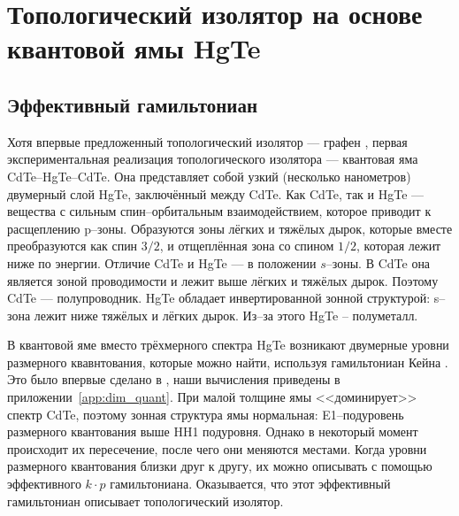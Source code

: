 \section{Топологический изолятор на основе квантовой ямы HgTe}
\subsection{Эффективный гамильтониан}
Хотя впервые предложенный топологический изолятор --- графен \cite{Kane2005}, 
первая экспериментальная реализация топологического изолятора ---
квантовая яма CdTe--HgTe--CdTe. Она представляет собой узкий (несколько нанометров)
двумерный слой HgTe, заключённый между CdTe. Как CdTe, так и HgTe --- вещества 
с сильным спин--орбитальным взаимодействием, которое приводит к расщеплению p--зоны.
Образуются зоны лёгких и тяжёлых дырок, которые вместе преобразуются как спин $3/2$,  
и отщеплённая зона со спином $1/2$, которая лежит ниже по энергии. Отличие CdTe и HgTe ---
в положении $s$--зоны. В CdTe она является зоной проводимости и лежит выше лёгких и тяжёлых
дырок. Поэтому CdTe --- полупроводник. HgTe обладает инвертированной зонной структурой:
s--зона лежит ниже тяжёлых и лёгких дырок. Из--за этого HgTe -- полуметалл. 

В квантовой яме вместо трёхмерного спектра HgTe возникают двумерные 
уровни размерного квавнтования, которые можно найти, используя гамильтониан Кейна 
\cite{Kane1957}. Это 
было впервые сделано в \cite{Bernevig2006}, наши вычисления приведены в 
приложении~\ref{app:dim_quant}.
При малой толщине ямы <<доминирует>> спектр CdTe, поэтому 
зонная структура ямы нормальная: E1--подуровень размерного квантования выше HH1 подуровня. 
Однако в некоторый момент происходит их пересечение, после чего они меняются местами. Когда 
уровни размерного квантования близки друг к другу, их можно описывать с помощью эффективного
$k\cdot p$ гамильтониана. Оказывается, что этот эффективный гамильтониан описывает
топологический изолятор.

